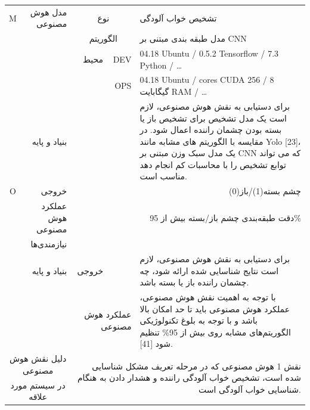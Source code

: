 \documentclass[a4paper,10pt]{article}
\begin{document}
\begin{table}[htbp]
\begin{tabularx}{\textwidth}{c c c c X}
                    \multicolumn{1}{c}{M} & \multicolumn{1}{r}{مدل هوش مصنوعی} & \multicolumn{2}{c}{نوع} & تشخیص خواب آلودگی \\
                    &  & \multicolumn{2}{c}{الگوریتم} & مدل طبقه بندی مبتنی بر CNN \\
                    &  & \multicolumn{1}{r}{محیط} & \multicolumn{1}{r}{DEV} & 04.18 Ubuntu / 0.5.2 Tensorflow / 7.3 Python / \dots \\
                    &  &  & \multicolumn{1}{r}{OPS} & 04.18 Ubuntu / cores CUDA 256 / 8 گیگابایت RAM / \dots \\
                    & \multicolumn{1}{r}{بنیاد و پایه} &  &  & برای دستیابی به نقش هوش مصنوعی، لازم است یک مدل تشخیص برای تشخیص باز یا بسته بودن چشمان راننده اعمال شود. در مقایسه با الگوریتم های مشابه مانند Yolo [23]، یک مدل سبک وزن مبتنی بر CNN که می تواند توابع تشخیص را با محاسبات کم انجام دهد مناسب است. \\

                    \multicolumn{1}{c}{O} & \multicolumn{1}{r}{خروجی} & \multicolumn{3}{r}{چشم بسته(1)/باز(0)} \\
                    & \multicolumn{1}{r}{عملکرد هوش مصنوعی} & \multicolumn{3}{r}{دقت طبقه‌بندی چشم باز/بسته بیش از 95\%} \\
                    & \multicolumn{1}{r}{نیازمندی‌ها} &  &  &  \\
                    & \multicolumn{1}{r}{بنیاد و پایه} & \multicolumn{1}{r}{خروجی} &  & برای دستیابی به نقش هوش مصنوعی، لازم است نتایج شناسایی شده ارائه شود، چه چشمان راننده باز یا بسته باشد. \\
                    &  & \multicolumn{2}{r}{عملکرد هوش مصنوعی} & با توجه به اهمیت نقش هوش مصنوعی، عملکرد هوش مصنوعی باید تا حد امکان بالا باشد و با توجه به بلوغ تکنولوژیکی الگوریتم‌های مشابه روی بیش از 95\% تنظیم شود [41]. \\
                    
                    \multicolumn{2}{c}{دلیل نقش هوش مصنوعی} & \multicolumn{3}{r}{\multirow{2}{*}{نقش 1 هوش مصنوعی که در مرحله تعریف مشکل شناسایی شده است، تشخیص خواب آلودگی راننده و هشدار دادن به هنگام شناسایی خواب آلودگی است.}} \\
                    \multicolumn{2}{c}{در سیستم مورد علاقه} & \\

                    \hline

                \end{tabularx}
                
            \end{table}
\end{document}
